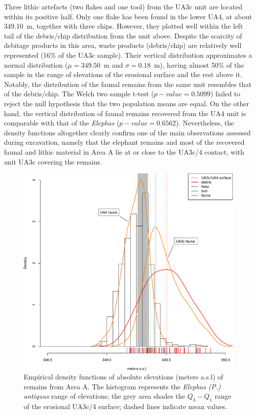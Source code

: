 \documentclass[review,authoryear,times]{elsarticle} %
\begin{document}
Three lithic artefacts (two flakes and one tool) from the UA3c unit are located within its positive half. Only one flake has been found in the lower UA4, at about 349.10~m, together with three chips. However, they plotted well within the left tail of the debris/chip distribution from the unit above. Despite the scarcity of debitage products in this area, waste products (debris/chip) are relatively well represented (16\% of the UA3c sample). Their vertical distribution approximates a normal distribution ($\mu=349.50$~m and $\sigma=0.18$~m), having almost 50\% of the sample in the range of elevations of the erosional surface and the rest above it. Notably, the distribution of the faunal remains from the same unit resembles that of the debris/chip. The Welch two sample t-test ($p-value=0.5099$) failed to reject the null hypothesis that the two population means are equal. On the other hand, the vertical distribution of faunal remains recovered from the UA4 unit is comparable with that of the \emph{Elephas} ($p-value=0.6562$).
Nevertheless, the density functions altogether clearly confirm one of the main observations assessed during excavation, namely that the elephant remains and most of the recovered faunal and lithic material in Area A lie at or close to the UA3c/4 contact, with unit UA3c covering the remains.

\begin{figure}[]
  \centering
  \includegraphics[width=1\textwidth]{../artwork/Fig7.pdf}
  \caption{Empirical density functions of absolute elevations (meters a.s.l) of remains from Area A. The histogram represents the \emph{Elephas (P.) antiquus} range of elevations; the grey area shades the $Q_3-Q_1$ range of the erosional UA3c/4 surface; dashed lines indicate mean values.}
  \label{fig:7}
\end{figure}
\end{document}
